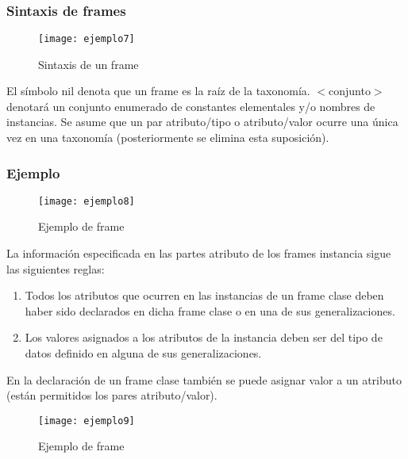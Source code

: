 \documentclass[12pt]{article}
\begin{document}
\ \\
\ \\
\ \\
\ \\
\ \\
\ \\
\ \\
\ \\
\subsubsection{Sintaxis de frames}
\begin{figure}[H]
\centering
\texttt{[image: ejemplo7]}
\caption{Sintaxis de un frame} \label{fig:ejemplo7}
\end{figure}

El símbolo nil denota que un frame es la raíz de la taxonomía. $<$conjunto$>$ denotará un conjunto enumerado de constantes elementales y/o nombres de instancias. Se asume que un par atributo/tipo o atributo/valor ocurre una única vez en una taxonomía (posteriormente se elimina esta suposición).

\subsubsection{Ejemplo}
\begin{figure}[H]
\centering
\texttt{[image: ejemplo8]}
\caption{Ejemplo de frame} \label{fig:ejemplo8}
\end{figure}

La información especificada en las partes atributo de los frames instancia sigue las siguientes reglas:
\begin{enumerate}
\item Todos los atributos que ocurren en las instancias de un frame clase deben haber sido declarados en dicha frame clase o en una de sus generalizaciones.
\item Los valores asignados a los atributos de la instancia deben ser del tipo de datos definido en alguna de sus generalizaciones.
\end{enumerate}

En la declaración de un frame clase también se puede asignar valor a un atributo (están permitidos los pares atributo/valor).

\begin{figure}[H]
\centering
\texttt{[image: ejemplo9]}
\caption{Ejemplo de frame} \label{fig:ejemplo9}
\end{figure}
\end{document}
